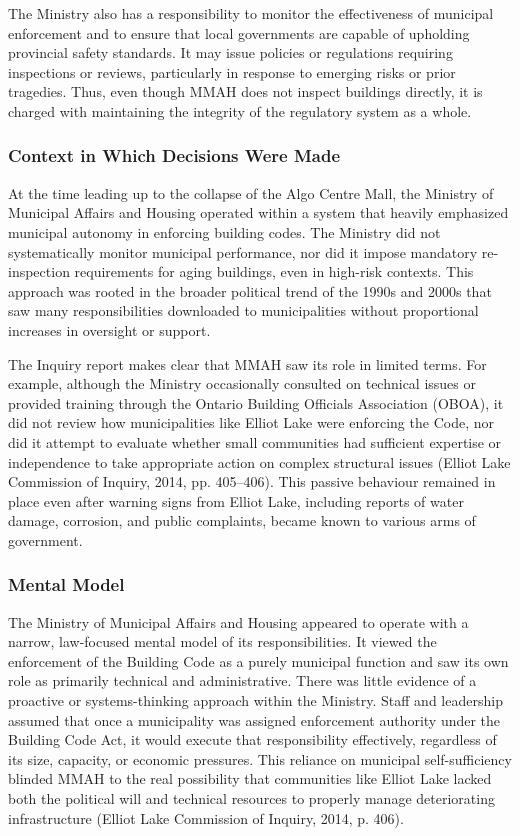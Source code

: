 \documentclass[12pt]{article}
\begin{document}
The Ministry also has a responsibility to monitor the effectiveness of municipal enforcement and to ensure that local governments are capable of upholding provincial safety standards. It may issue policies or regulations requiring inspections or reviews, particularly in response to emerging risks or prior tragedies. Thus, even though MMAH does not inspect buildings directly, it is charged with maintaining the integrity of the regulatory system as a whole.

\subsubsection*{Context in Which Decisions Were Made}
At the time leading up to the collapse of the Algo Centre Mall, the Ministry of Municipal Affairs and Housing operated within a system that heavily emphasized municipal autonomy in enforcing building codes. The Ministry did not systematically monitor municipal performance, nor did it impose mandatory re-inspection requirements for aging buildings, even in high-risk contexts. This approach was rooted in the broader political trend of the 1990s and 2000s that saw many responsibilities downloaded to municipalities without proportional increases in oversight or support.

The Inquiry report makes clear that MMAH saw its role in limited terms. For example, although the Ministry occasionally consulted on technical issues or provided training through the Ontario Building Officials Association (OBOA), it did not review how municipalities like Elliot Lake were enforcing the Code, nor did it attempt to evaluate whether small communities had sufficient expertise or independence to take appropriate action on complex structural issues (Elliot Lake Commission of Inquiry, 2014, pp. 405–406). This passive behaviour remained in place even after warning signs from Elliot Lake, including reports of water damage, corrosion, and public complaints, became known to various arms of government.

\subsubsection*{Mental Model}
The Ministry of Municipal Affairs and Housing appeared to operate with a narrow, law-focused mental model of its responsibilities. It viewed the enforcement of the Building Code as a purely municipal function and saw its own role as primarily technical and administrative. There was little evidence of a proactive or systems-thinking approach within the Ministry. Staff and leadership assumed that once a municipality was assigned enforcement authority under the Building Code Act, it would execute that responsibility effectively, regardless of its size, capacity, or economic pressures. This reliance on municipal self-sufficiency blinded MMAH to the real possibility that communities like Elliot Lake lacked both the political will and technical resources to properly manage deteriorating infrastructure (Elliot Lake Commission of Inquiry, 2014, p. 406).
\end{document}
